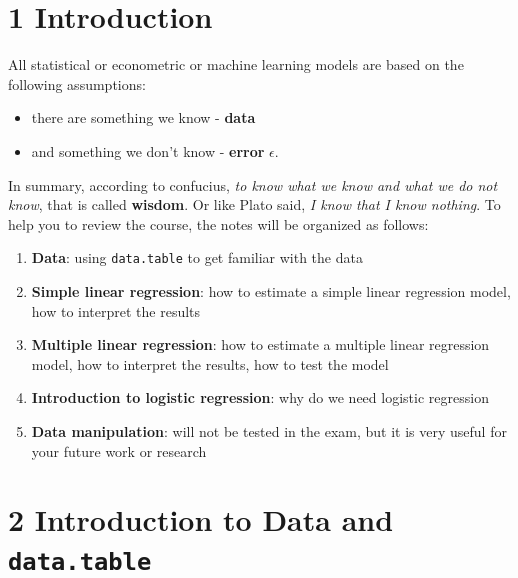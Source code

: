 \documentclass[11pt]{article}
\theoremstyle{definition}
\providecommand{\tightlist}{%
\setlength{\itemsep}{0pt}\setlength{\parskip}{0pt}}
\begin{document}
\vskip -8.5pt


\noindent  

\hypersetup{linkcolor=black}
\setcounter{tocdepth}{3}
\tableofcontents


\newpage
{}
\setcounter{page}{1}
\section{1 Introduction}

All statistical or econometric or machine learning models are based on 
the following assumptions:

\begin{itemize}
\tightlist
\item there are something we know - \textbf{data}
\item and something we don't know - \textbf{error} \(\epsilon\).
\end{itemize}

In summary, according to confucius, \textit{to know what we know and what we do not know}, 
that is called \textbf{wisdom}. Or like Plato said, \textit{I know that I know nothing}.
To help you to review the course, the notes will be organized as follows:

\begin{enumerate}
\tightlist 
  \item \textbf{Data}: using \texttt{data.table} to get familiar with the data
  \item \textbf{Simple linear regression}: how to estimate a simple linear regression model, how to interpret the results
  \item \textbf{Multiple linear regression}: how to estimate a multiple linear regression model, how to interpret the results, how to test the model
  \item \textbf{Introduction to logistic regression}: why do we need logistic regression
  \item \textbf{Data manipulation}: will not be tested in the exam, but it is very useful for your future work or research
\end{enumerate}



\section{2 Introduction to Data and \texttt{data.table}}
\end{document}
